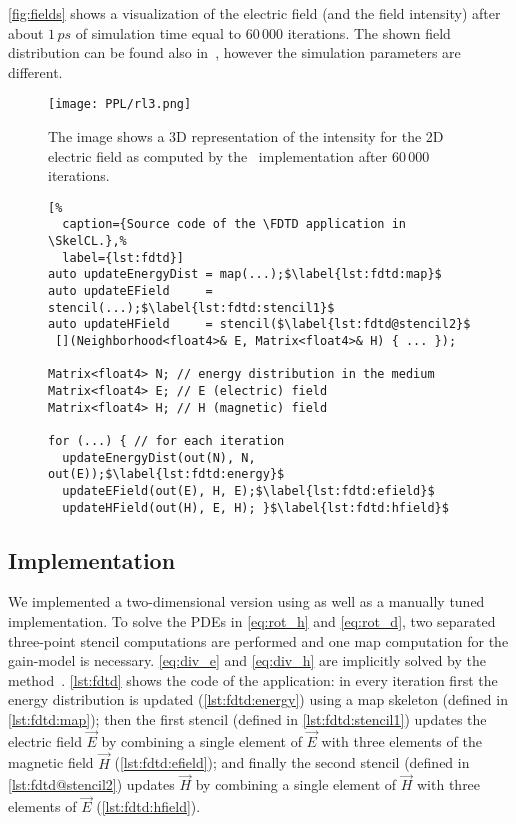 \autoref{fig:fields} shows a visualization of the electric field (and the field intensity) after about  $1\,ps$ of simulation time equal to $60\,000$ iterations.
The shown field distribution can be found also in~\cite{Sebbah2002, Yamilov2005}, however the simulation parameters are different.

\begin{figure}[t]
    \centering
    \texttt{[image: PPL/rl3.png]}
    \caption[A 3D representation of the inensity of the 2D electric field as computed by the \SkelCL\ \FDTD implementation.]%
            {The image shows a 3D representation of the intensity for the 2D electric field as computed by the \SkelCL\ \FDTD implementation after $60\,000$ iterations.}
    \label{fig:fields}
\end{figure}

\begin{figure}[tbp]
\begin{lstlisting}[%
  caption={Source code of the \FDTD application in \SkelCL.},%
  label={lst:fdtd}]
auto updateEnergyDist = map(...);$\label{lst:fdtd:map}$
auto updateEField     = stencil(...);$\label{lst:fdtd:stencil1}$
auto updateHField     = stencil($\label{lst:fdtd@stencil2}$
 [](Neighborhood<float4>& E, Matrix<float4>& H) { ... });

Matrix<float4> N; // energy distribution in the medium
Matrix<float4> E; // E (electric) field
Matrix<float4> H; // H (magnetic) field

for (...) { // for each iteration
  updateEnergyDist(out(N), N, out(E));$\label{lst:fdtd:energy}$
  updateEField(out(E), H, E);$\label{lst:fdtd:efield}$
  updateHField(out(H), E, H); }$\label{lst:fdtd:hfield}$
\end{lstlisting}
\end{figure}

\subsection*{\SkelCL Implementation}

We implemented a two-dimensional version using \SkelCL as well as a manually tuned \OpenCL implementation.
To solve the PDEs in \autoref{eq:rot_h} and \autoref{eq:rot_d}, two separated three-point stencil computations are performed and one map computation for the gain-model is necessary.
\autoref{eq:div_e} and \autoref{eq:div_h} are implicitly solved by the \FDTD method~\cite{Yee1966}.
\autoref{lst:fdtd} shows the \SkelCL code of the application:
in every iteration first the energy distribution is updated (\autoref{lst:fdtd:energy}) using a map skeleton (defined in \autoref{lst:fdtd:map});
then the first stencil (defined in \autoref{lst:fdtd:stencil1}) updates the electric field $\vec{E}$ by combining a single element of $\vec{E}$ with three elements of the magnetic field $\vec{H}$ (\autoref{lst:fdtd:efield});
and finally the second stencil (defined in \autoref{lst:fdtd@stencil2}) updates $\vec{H}$ by combining a single element of $\vec{H}$ with three elements of $\vec{E}$ (\autoref{lst:fdtd:hfield}).

